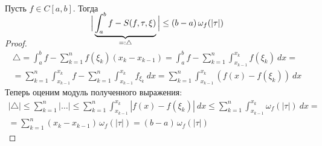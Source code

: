 \begin{theorem}
    Пусть $f \in C[a, b]$. Тогда
    \begin{equation*}
    \smash{\Big{|} \underbrace{\int_{a}^{b} f - S(f, \tau, \xi)}_
    {=: \triangle}\Big{|}}
    \leq (b - a)\, \omega_f (|\tau|)
    \end{equation*}
\end{theorem}
\begin{proof}
  \begin{equation*}
    \begin{gathered}
      \triangle = \int_{a}^{b} f - \sum_{k = 1}^{n} f (\xi_k)
      (x_k - x_{k - 1}) = \int_{a}^{b} f - \sum_{k = 1}^{n}
      \int_{x_{k - 1}}^{x_k} f(\xi_k) \: dx
      = \\ =
      \sum_{k = 1}^{n} \int_{x_{k - 1}}^{x_k} f -
      \sum_{k = 1}^{n} \int_{x_{k - 1}}^{x_k} f_{\xi_k} \: dx =
      \sum_{k = 1}^{n} \int_{x_{k - 1}}^{x_k} (f(x) - f(\xi_k)) \: dx
    \end{gathered}
  \end{equation*}
  Теперь оценим модуль полученного выражения:
  \begin{equation*}
    \begin{gathered}
      |\triangle| \leq \sum_{k = 1}^{n} \Big| \dotso \Big| \leq
      \sum_{k = 1}^{n} \int_{x_{k - 1}}^{x_k} |f(x) - f(\xi_k)| \: dx \leq
      \sum_{k = 1}^{n} \int_{x_{k - 1}}^{x_k} \omega_f(|\tau|) \: dx
      = \\ =
      \sum_{k = 1}^{n} (x_k - x_{k - 1})\, \omega_f(|\tau|) = (b - a)\, \omega_f(|\tau|)
    \end{gathered}
  \end{equation*}
\end{proof}

